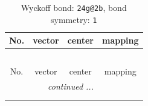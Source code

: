 \documentclass[fleqn,8pt]{jsarticle}
\begin{document}
\renewcommand{\arraystretch}{1.2}
\begin{longtable}{cccc}
\caption{Wyckoff bond: {\tt 24g@2b}, bond symmetry: {\tt 1}}
 \\
 \hline \hline
No. & vector & center & mapping \\ \hline \endfirsthead

\multicolumn{3}{l}{\tablename\ \thetable{}} \\
 \hline \hline
No. & vector & center & mapping \\ \hline \endhead

 \hline \hline
\multicolumn{3}{r}{\footnotesize\it continued ...} \\ \endfoot

 \hline \hline
\multicolumn{3}{r}{} \\ \endlastfoot


\end{longtable}
\end{document}
